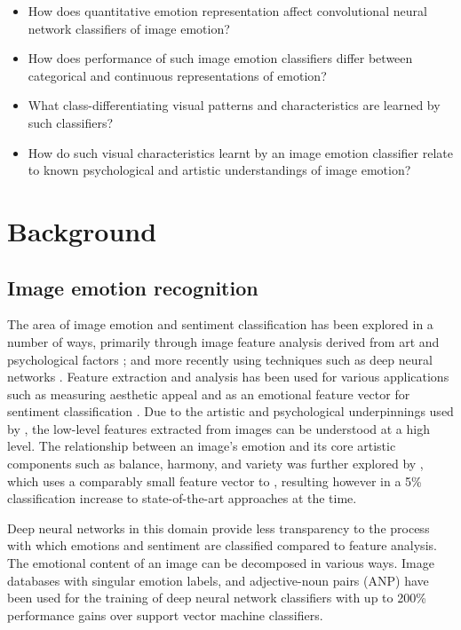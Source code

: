 \documentclass{article}
\begin{document}
\begin{itemize}
	\item How does quantitative emotion representation affect convolutional neural network classifiers of image emotion?
	\item How does performance of such image emotion classifiers differ between categorical and continuous representations of emotion?
	\item What class-differentiating visual patterns and characteristics are learned by such classifiers?
	\item How do such visual characteristics learnt by an image emotion classifier relate to known psychological and artistic understandings of image emotion?
\end{itemize}


\section{Background}

\subsection{Image emotion recognition}

The area of image emotion and sentiment classification has been explored in a number of ways, primarily through image feature analysis derived from art and psychological factors \citep{machajdik2010affective}; and more recently using techniques such as deep neural networks \citep{chen2015learning, kim2018building}.
Feature extraction and analysis has been used for various applications such as measuring aesthetic appeal \citep{den2010using,den2010comparing,den2011evolving} and as an emotional feature vector for sentiment classification \citep{machajdik2010affective}.
Due to the artistic and psychological underpinnings used by \citet{machajdik2010affective}, the low-level features extracted from images can be understood at a high level.
The relationship between an image's emotion and its core artistic components such as balance, harmony, and variety was further explored by \citet{zhao2014exploring}, which uses a comparably small feature vector to \citet{machajdik2010affective}, resulting however in a 5\% classification increase to state-of-the-art approaches at the time.

Deep neural networks in this domain provide less transparency to the process with which emotions and sentiment are classified compared to feature analysis.
The emotional content of an image can be decomposed in various ways.
Image databases with singular emotion labels, and adjective-noun pairs (ANP) have been used for the training of deep neural network classifiers \citep{chen2014deepsentibank, yang2018visual} with up to 200\% performance gains over support vector machine classifiers.
\end{document}
